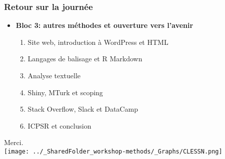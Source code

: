 \documentclass{beamer}
\begin{document}
    \begin{frame}
    \frametitle{Retour sur la journée}
     \begin{itemize}
      \item \textbf{Bloc 3: autres méthodes et ouverture vers l'avenir}
          \begin{enumerate}
            \item Site web, introduction à WordPress et HTML
            \item Langages de balisage et R Markdown
            \item Analyse textuelle
            \item Shiny, MTurk et scoping
            \item Stack Overflow, Slack et DataCamp
            \item ICPSR et conclusion
          \end{enumerate}
      \end{itemize}
    \end{frame}
    
    \begin{frame}
     \begin{center}
          \Huge Merci. \\
          \vspace{0.5cm}
          \texttt{[image: ../\_SharedFolder\_workshop-methods/\_Graphs/CLESSN.png]}
      \end{center}
    \end{frame}
    

  
\end{document}
